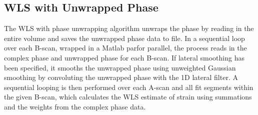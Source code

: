 \subsection{WLS with Unwrapped Phase}
The WLS with phase unwrapping algorithm unwraps the phase by reading in the entire volume and saves the unwrapped phase data to file. In a sequential loop over each B-scan, wrapped in a Matlab parfor parallel, the process reads in the complex phase and unwrapped phase for each B-scan. If lateral smoothing has been specified, it smooths the unwrapped phase using unweighted Gaussian smoothing by convoluting the unwrapped phase with the 1D lateral filter. A sequential looping is then performed over each A-scan and all fit segments within the given B-scan, which calculates the WLS estimate of strain using summations and the weights from the complex phase data.

